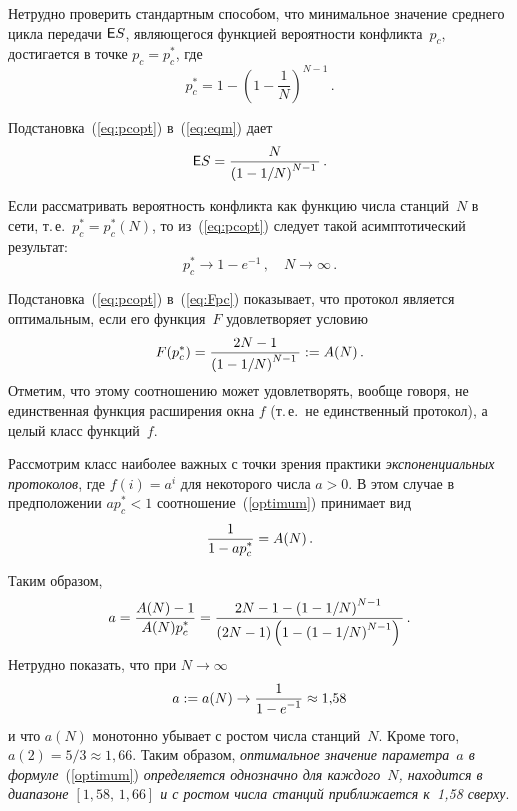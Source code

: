 \begin{multicols}{2}
Нетрудно проверить стандартным способом, что   минимальное значение
среднего цикла передачи ${\sf E} S$, являющегося функцией  вероятности
конфликта~$p_c$, достигается в точке $p_c=p_c^*$, где
\begin{equation}
   p_c^* = 1 - \left(1-\frac1N\right)^{N-1}\,.
    \label{eq:pcopt}
\end{equation}

Подстановка~(\ref{eq:pcopt}) в~(\ref{eq:eqm}) дает
\begin{equation}
{\sf E} S =\displaystyle\frac{\displaystyle N\mathstrut}{\displaystyle \left(1-1/N \right)^{N-1}\mathstrut}\,. 
\label{eq:8}
\end{equation}

Если рассматривать  вероятность конфликта как функцию числа станций~$N$ 
в сети, т.\,е.\ $p_c^*=p_c^*(N)$, то из~(\ref{eq:pcopt}) следует
такой асимптотический результат:
\begin{equation*}
p_c^* \to 1-e^{-1}\,,\quad N\to \infty\,. 
\end{equation*}

Подстановка~(\ref{eq:pcopt}) в~(\ref{eq:Fpc}) показывает, что
протокол является оптимальным, если его функция~$F$ удовлетворяет
условию
\begin{equation}
   F(p_c^*) =
   \displaystyle\frac{\displaystyle 2N-1\mathstrut}{\displaystyle \left(1-1/N\right)^{N-1}\mathstrut}:=A(N)\,.
   \label{optimum}
\end{equation}
Отметим, что этому соотношению  может удовлетворять, вообще говоря,
не единственная функция расширения окна $f$ (т.\,е.\ не  единственный
протокол), а целый класс функций~$f$.

Рассмотрим класс наиболее важных с точки зрения практики  {\it
экспоненциальных протоколов}, где $f(i)=a^i$ для некоторого числа
$a>0$. В этом случае  в предположении $a p_c^*<1 $ соотношение~(\ref{optimum}) принимает вид
\begin{equation*}
\displaystyle\frac{\displaystyle 1\mathstrut}{\displaystyle 1-ap_c^*\mathstrut} =A(N)\,. 
\end{equation*}

Таким образом,
$$
a=\displaystyle\frac{\displaystyle A(N)-1\mathstrut}{\displaystyle A(N)
p_c^*\mathstrut}=\displaystyle\frac{\displaystyle 2N-1-\left(1-1/N\right)^{N-1}\mathstrut}{\displaystyle \left(2N-1\right)\left(1-\left(1-1/N\right)^{N-1}\right)\mathstrut}\,.
$$
Нетрудно показать, что  при $N\to \infty$
$$
a:=a(N)\to \displaystyle\frac{\displaystyle 1\mathstrut}{\displaystyle 1-e^{-1}\mathstrut}\approx 1{,}58
$$
 и   что $a(N)$ монотонно убывает с ростом
 числа станций~$N$.  Кроме того,  $a(2)=5/3\approx 1{,}66.$
Таким образом,  {\it оптимальное значение  параметра~$a$ в формуле}~(\ref{optimum})
\textit{определяется однозначно для каждого~$N$, находится в
диапазоне $[1{,}58,\, 1{,}66]$ и  с ростом  числа станций приближается к~1,58  сверху}.


\end{multicols}
